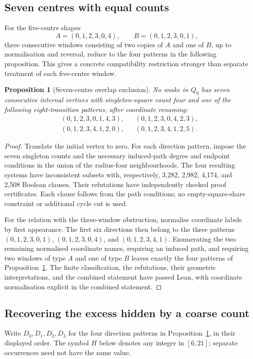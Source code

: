 \documentclass[11pt,a4paper]{article}
\newtheorem{proposition}[theorem]{Proposition}
\theoremstyle{definition}
\theoremstyle{remark}
\newcommand{\Q}{Q}
\begin{document}
\subsection{Seven centres with equal counts}\label{sec:share-overlap}
For the five-centre shapes
\[
A=(0,1,2,3,0,4),\qquad B=(0,1,2,3,0,1),
\]
three consecutive windows consisting of two copies of $A$ and one of $B$, up to normalisation and reversal, reduce to the four patterns in the following proposition. This gives a concrete compatibility restriction stronger than separate treatment of each five-centre window.

\begin{proposition}[Seven-centre overlap exclusion]\label{prop:seven-overlap}
No snake in $\Q_9$ has seven consecutive internal vertices with singleton-square count four and one of the following eight-transition patterns, after coordinate renaming:
\[
\begin{aligned}
&(0,1,2,3,0,1,4,3), &&(0,1,2,3,0,4,2,3),\\
&(0,1,2,3,4,1,2,0), &&(0,1,2,3,4,1,2,5).
\end{aligned}
\]
\end{proposition}
\begin{proof}
Translate the initial vertex to zero. For each direction pattern, impose the seven singleton counts and the necessary induced-path degree and endpoint conditions in the union of the radius-four neighbourhoods. The four resulting systems have inconsistent subsets with, respectively, 3,282, 2,982, 4,174, and 2,508 Boolean clauses. Their refutations have independently checked proof certificates. Each clause follows from the path conditions; no empty-square-share constraint or additional cycle cut is used.

For the relation with the three-window obstruction, normalise coordinate labels by first appearance. The first six directions then belong to the three patterns $(0,1,2,3,0,1)$, $(0,1,2,3,0,4)$, and $(0,1,2,3,4,1)$. Enumerating the two remaining normalised coordinate names, requiring an induced path, and requiring two windows of type $A$ and one of type $B$ leaves exactly the four patterns of Proposition~\ref{prop:seven-overlap}. The finite classification, the refutations, their geometric interpretations, and the combined statement have passed Lean, with coordinate normalisation explicit in the combined statement.
\end{proof}

\subsection{Recovering the excess hidden by a coarse count}\label{sec:coarse-excess}
Write $D_0,D_1,D_2,D_3$ for the four direction patterns in Proposition~\ref{prop:seven-overlap}, in their displayed order. The symbol $H$ below denotes any integer in $[6,21]$; separate occurrences need not have the same value.
\end{document}
